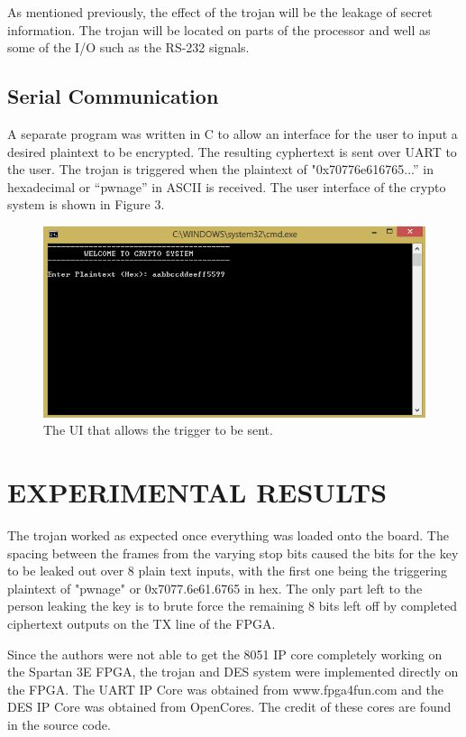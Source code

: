 \documentclass[letterpaper, 10 pt, conference]{ieeeconf}  %
\begin{document}
As mentioned previously, the effect of the trojan will be the leakage of secret information.  The trojan will be located on parts of the processor and well as some of the I/O such as the RS-232 signals.

\subsection{Serial Communication}

A separate program was written in C to allow an interface for the user to input a desired plaintext to be encrypted.  The resulting cyphertext is sent over UART to the user.  The trojan is triggered when the plaintext of "0x70776e616765...” in hexadecimal or “pwnage” in ASCII is received.  The user interface of the crypto system is shown in Figure 3.

\begin{figure}[thpb]
	\centering
	\includegraphics[scale=.50]{SerialProg}
   \caption{The UI that allows the trigger to be sent.}
\end{figure}
  
\section{EXPERIMENTAL RESULTS}

The trojan worked as expected once everything was loaded onto the board. The spacing between the frames from the varying stop bits caused the bits for the key to be leaked out over 8 plain text inputs, with the first one being the triggering plaintext of "pwnage" or 0x7077.6e61.6765 in hex. The only part left to the person leaking the key is to brute force the remaining 8 bits left off by completed ciphertext outputs on the TX line of the FPGA.

Since the authors were not able to get the 8051 IP core completely working on the Spartan 3E FPGA, the trojan and DES system were implemented directly on the FPGA.  The UART IP Core was obtained from www.fpga4fun.com and the DES IP Core was obtained from OpenCores.  The credit of these cores are found in the source code.
\end{document}
